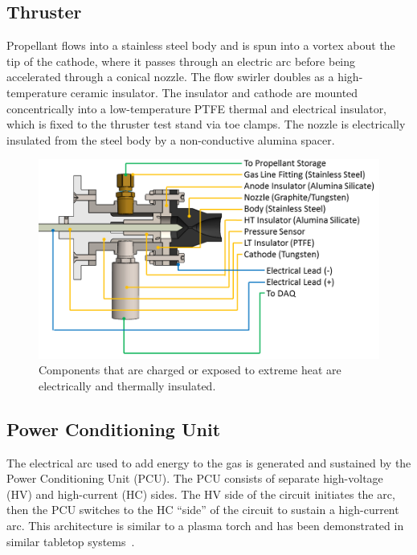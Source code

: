 \documentclass[journal]{IEEEtran}
\begin{document}
\subsection{Thruster}
Propellant flows into a stainless steel body and is spun into a vortex about the tip of the cathode, where it passes through an electric arc before being accelerated through a conical nozzle.
The flow swirler doubles as a high-temperature ceramic insulator.
The insulator and cathode are mounted concentrically into a low-temperature PTFE thermal and electrical insulator, which is fixed to the thruster test stand via toe clamps.
The nozzle is electrically insulated from the steel body by a non-conductive alumina spacer.

\begin{figure}[htp]
  \centering
  \includegraphics[width=\linewidth]{figs/cutaway_annotated.png}
  \caption[P17101 Arcjet Annotated Cutaway]{Components that are charged or exposed to extreme heat are electrically and thermally insulated.
\label{fig:annotated-cutaway}
}
\end{figure}

\subsection{Power Conditioning Unit}
The electrical arc used to add energy to the gas is generated and sustained by the Power Conditioning Unit (PCU).
The PCU consists of separate high-voltage (HV) and high-current (HC) sides.
The HV side of the circuit initiates the arc, then the PCU switches to the HC ``side'' of the circuit to sustain a high-current arc.
This architecture is similar to a plasma torch and has been demonstrated in similar tabletop systems~\cite{park2015thesis}.
\end{document}
